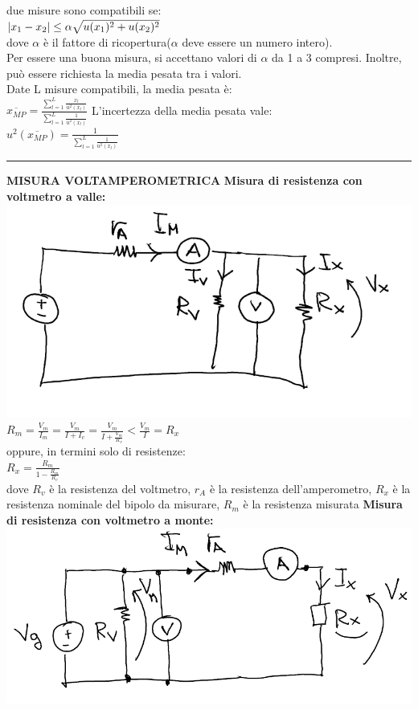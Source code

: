 \documentclass{article}
\begin{document}
\begin{multicols*}{3}
    due misure sono compatibili se: \\
    $\abs{x_1 - x_2} \leq \alpha \sqrt{u(x_1) ^{2} + u(x_2) ^{2} }$ \\
    dove $\alpha$ è il fattore di ricopertura($\alpha$ deve essere un numero intero). \\
    Per essere una buona misura, si accettano valori di $\alpha$ da 1 a 3 compresi. \newline 
    Inoltre, può essere richiesta la media pesata tra i valori. \\
    Date L misure compatibili, la media pesata è: \\
    $\overline{x_{MP}} = \frac{\sum_{l = 1}^{L} \frac{x_l}{u^{2}(x_l)}}{\sum_{l = 1}^{L} \frac{1}{u^{2}(x_l)}}$ \newline 
    L'incertezza della media pesata vale: \\
    $u^{2} (\overline{x_{MP}}) = \frac{1}{\sum_{l = 1}^{L} \frac{1}{u^{2}(x_l)}}$
    \hrule
    \textbf{MISURA VOLTAMPEROMETRICA} \newline
    \textbf{Misura di resistenza con voltmetro a valle:} \\
    \includegraphics[scale = 0.5]{Valle.PNG}
    $R_m = \frac{V_m}{I_m} = \frac{V_m}{I + I_v} = \frac{V_m}{I + \frac{V_m}{R_v}} < \frac{V_m}{I} = R_x $ \\
    oppure, in termini solo di resistenze: \\ 
    $R_x = \frac{R_m}{1 - \frac{R_m}{R_v}}$ \\
    dove $R_v$ è la resistenza del voltmetro, $r_A$ è la resistenza dell'amperometro, $R_x$ è la resistenza nominale del bipolo da misurare, $R_m$ è la resistenza misurata \newline
    \textbf{Misura di resistenza con voltmetro a monte:} \\
    \includegraphics[scale = 0.44]{Monte.PNG}\\

\end{multicols*}
\end{document}
